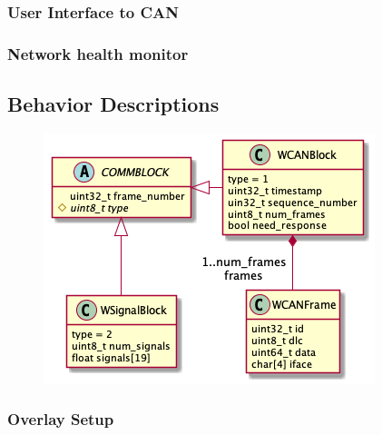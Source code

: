 \documentclass[letterpaper,twocolumn,12pt]{article}
\begin{document}
\subsubsection{User Interface to CAN}
\subsubsection{Network health monitor}

\subsection{Behavior Descriptions}
\begin{figure}[t!]
    \centering
    \includegraphics[width=\linewidth]{out/images/data_structures/data_structures.png}
    \caption{}
    \label{fig:}
\end{figure}

\subsubsection{Overlay Setup}
\end{document}
